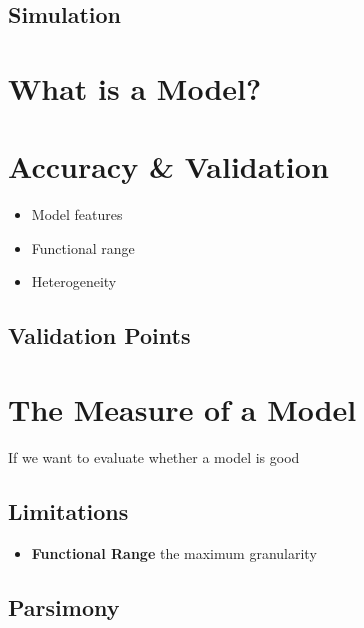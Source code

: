 \documentclass[
]{book}
\providecommand{\tightlist}{%
  \setlength{\itemsep}{0pt}\setlength{\parskip}{0pt}}
\begin{document}
\hypertarget{simulation}{%
\subsection{Simulation}\label{simulation}}

\hypertarget{what-is-a-model}{%
\section{What is a Model?}\label{what-is-a-model}}

\hypertarget{accuracy-validation}{%
\section{Accuracy \& Validation}\label{accuracy-validation}}

\begin{itemize}
\item
  Model features
\item
  Functional range
\item
  Heterogeneity
\end{itemize}

\hypertarget{validation-points}{%
\subsection{Validation Points}\label{validation-points}}

\hypertarget{the-measure-of-a-model}{%
\section{The Measure of a Model}\label{the-measure-of-a-model}}

If we want to evaluate whether a model is good

\hypertarget{limitations}{%
\subsection{Limitations}\label{limitations}}

\begin{itemize}
\tightlist
\item
  \textbf{Functional Range} the maximum granularity
\end{itemize}

\hypertarget{parsimony}{%
\subsection{Parsimony}\label{parsimony}}
\end{document}
